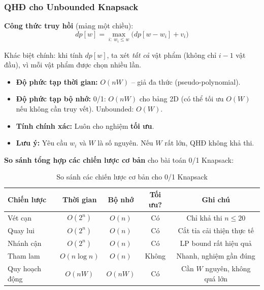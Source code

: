 \documentclass[fontsize=13pt,a4paper]{report}
\begin{document}
\subsubsection*{QHĐ cho Unbounded Knapsack}

\textbf{Công thức truy hồi} (mảng một chiều):
\begin{equation}
dp[w] = \max_{i:\; w_i \leq w} \big(dp[w-w_i] + v_i\big)
\label{eq:dpub}
\end{equation}

Khác biệt chính: khi tính $dp[w]$, ta xét \textit{tất cả} vật phẩm (không chỉ $i-1$ vật đầu), vì mỗi vật phẩm được chọn nhiều lần.

\begin{itemize}[noitemsep]
    \item \textbf{Độ phức tạp thời gian:} $O(nW)$ -- giả đa thức (pseudo-polynomial).
    \item \textbf{Độ phức tạp bộ nhớ:} 0/1: $O(nW)$ cho bảng 2D (có thể tối ưu $O(W)$ nếu không cần truy vết). Unbounded: $O(W)$.
    \item \textbf{Tính chính xác:} Luôn cho nghiệm \textbf{tối ưu}.
    \item \textbf{Lưu ý:} Yêu cầu $w_i$ và $W$ là số nguyên. Nếu $W$ rất lớn, QHĐ không khả thi.
\end{itemize}


\textbf{So sánh tổng hợp các chiến lược cơ bản} cho bài toán 0/1 Knapsack:

\begin{table}[H]
\centering
\begin{tabular}{l|cccc}
\toprule
\textbf{Chiến lược} & \textbf{Thời gian} & \textbf{Bộ nhớ} & \textbf{Tối ưu?} & \textbf{Ghi chú} \\
\midrule
Vét cạn & $O(2^n)$ & $O(n)$ & Có & Chỉ khả thi $n \leq 20$ \\
Quay lui & $O(2^n)$ & $O(n)$ & Có & Cắt tỉa cải thiện thực tế \\
Nhánh cận & $O(2^n)$ & $O(n)$ & Có & LP bound rất hiệu quả \\
Tham lam & $O(n \log n)$ & $O(n)$ & Không & Nhanh, nghiệm gần đúng \\
Quy hoạch động & $O(nW)$ & $O(nW)$ & Có & Cần $W$ nguyên, không quá lớn \\
\bottomrule
\end{tabular}
\caption{So sánh các chiến lược cơ bản cho 0/1 Knapsack}
\label{tab:compare_strategies}
\end{table}
\end{document}
